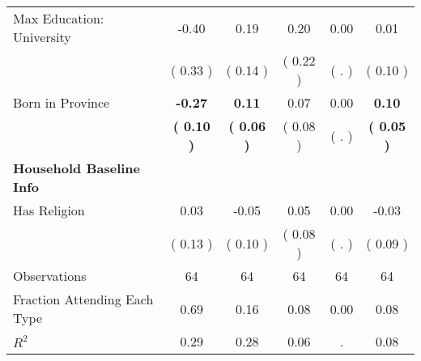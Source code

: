 \begin{table}[H]
{\begin{tabular}{lccccc}
\quad Max Education: University &     -0.40 &      0.19 &      0.20 &      0.00 &      0.01 \\
\quad  & (     0.33 ) & (     0.14 )  & (     0.22 )  & (        . ) & (     0.10 ) \\
\quad Born in Province & \textbf{    -0.27} & \textbf{     0.11} &      0.07 &      0.00 & \textbf{     0.10} \\
\quad  & \textbf{(     0.10 )} & \textbf{(     0.06 )}  & (     0.08 )  & (        . ) & \textbf{(     0.05 )} \\
\midrule
\textbf{Household Baseline Info} \\
\quad Has Religion &      0.03 &     -0.05 &      0.05 &      0.00 &     -0.03 \\
\quad  & (     0.13 ) & (     0.10 )  & (     0.08 )  & (        . ) & (     0.09 ) \\
\midrule
Observations & 64 & 64 & 64 & 64 & 64 \\
Fraction Attending Each Type &      0.69 &      0.16 &      0.08 &      0.00 &      0.08 \\
\midrule
$ R^2$ &      0.29 &      0.28 &      0.06 &         . &      0.08 \\
\bottomrule
\end{tabular}}
\end{table}
